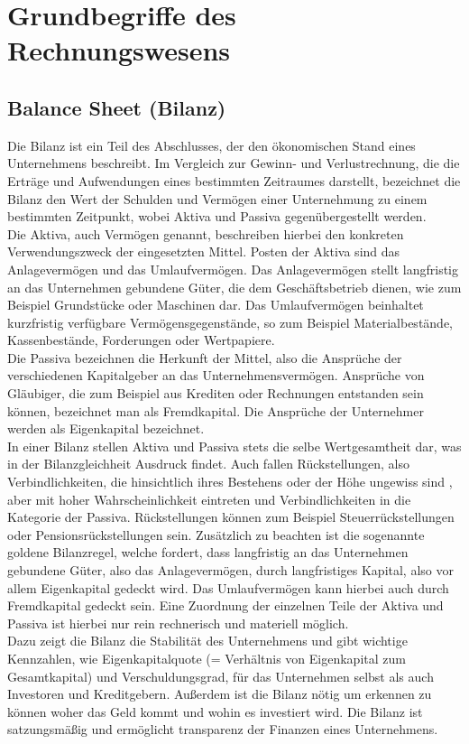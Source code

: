 \section{Grundbegriffe des Rechnungswesens}

\subsection{Balance Sheet (Bilanz)}
Die Bilanz ist ein Teil des Abschlusses, der den ökonomischen Stand eines Unternehmens beschreibt. Im Vergleich zur Gewinn- und Verlustrechnung, die die Erträge und Aufwendungen eines bestimmten Zeitraumes darstellt, bezeichnet die Bilanz den Wert der Schulden und Vermögen einer Unternehmung zu einem bestimmten Zeitpunkt, wobei Aktiva und Passiva gegenübergestellt werden.\cite{businesson}
\\
Die Aktiva, auch Vermögen genannt, beschreiben hierbei den konkreten Verwendungszweck der eingesetzten Mittel. Posten der Aktiva sind das Anlagevermögen und das Umlaufvermögen. Das Anlagevermögen stellt langfristig an das Unternehmen gebundene Güter, die dem Geschäftsbetrieb dienen, wie zum Beispiel Grundstücke oder Maschinen dar. Das Umlaufvermögen beinhaltet kurzfristig verfügbare Vermögensgegenstände, so zum Beispiel Materialbestände, Kassenbestände, Forderungen oder Wertpapiere.
\\
Die Passiva bezeichnen die Herkunft der Mittel, also die Ansprüche der verschiedenen Kapitalgeber an das Unternehmensvermögen. Ansprüche von Gläubiger, die zum Beispiel aus Krediten oder Rechnungen entstanden sein können, bezeichnet man als Fremdkapital. Die Ansprüche der Unternehmer werden als Eigenkapital bezeichnet.\cite{bilanz}
\\
In einer Bilanz stellen Aktiva und Passiva stets die selbe Wertgesamtheit dar, was in der Bilanzgleichheit Ausdruck findet. Auch fallen Rückstellungen, also Verbindlichkeiten, die hinsichtlich ihres Bestehens oder der Höhe ungewiss sind \cite{rueckstellung}, aber mit hoher Wahrscheinlichkeit eintreten und Verbindlichkeiten in die Kategorie der Passiva. Rückstellungen können zum Beispiel Steuerrückstellungen oder Pensionsrückstellungen sein. Zusätzlich zu beachten ist die sogenannte goldene Bilanzregel, welche fordert, dass langfristig an das Unternehmen gebundene Güter, also das Anlagevermögen, durch langfristiges Kapital, also vor allem Eigenkapital gedeckt wird. Das Umlaufvermögen kann hierbei auch durch Fremdkapital gedeckt sein. Eine Zuordnung der einzelnen Teile der Aktiva und Passiva ist hierbei nur rein rechnerisch und materiell möglich.\cite{bilanzregel}
\\
Dazu zeigt die Bilanz die Stabilität des Unternehmens und gibt wichtige Kennzahlen, wie Eigenkapitalquote (= Verhältnis von Eigenkapital zum Gesamtkapital) und Verschuldungsgrad, für das Unternehmen selbst als auch Investoren und Kreditgebern. Außerdem ist die Bilanz nötig um erkennen zu können woher das Geld kommt und wohin es investiert wird. Die Bilanz ist satzungsmäßig und ermöglicht transparenz der Finanzen eines Unternehmens.

